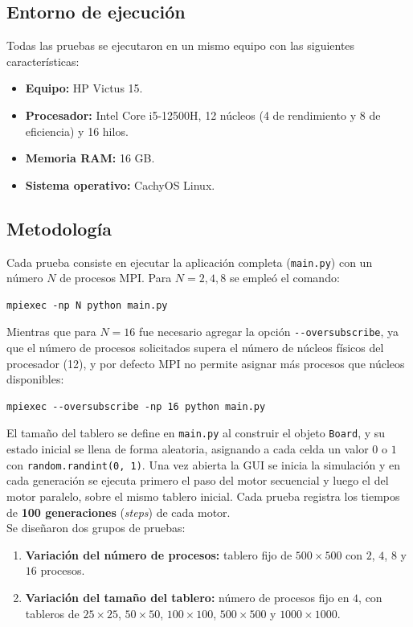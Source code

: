 \documentclass{article}
\begin{document}
\subsection{Entorno de ejecución}
Todas las pruebas se ejecutaron en un mismo equipo con las siguientes características:
\begin{itemize}
    \item \textbf{Equipo:} HP Victus 15.
    \item \textbf{Procesador:} Intel Core i5-12500H, 12 núcleos (4 de rendimiento y 8 de eficiencia) y 16 hilos.
    \item \textbf{Memoria RAM:} 16 GB.
    \item \textbf{Sistema operativo:} CachyOS Linux.
\end{itemize}

\subsection{Metodología}
Cada prueba consiste en ejecutar la aplicación completa (\verb|main.py|) con un número $N$ de procesos MPI. Para $N = 2, 4, 8$ se empleó el comando:
\begin{verbatim}
mpiexec -np N python main.py
\end{verbatim}

Mientras que para $N = 16$ fue necesario agregar la opción \verb|--oversubscribe|, ya que el número de procesos solicitados supera el número de núcleos físicos del procesador (12), y por defecto MPI no permite asignar más procesos que núcleos disponibles:
\begin{verbatim}
mpiexec --oversubscribe -np 16 python main.py
\end{verbatim}

El tamaño del tablero se define en \verb|main.py| al construir el objeto \verb|Board|, y su estado inicial se llena de forma aleatoria, asignando a cada celda un valor $0$ o $1$ con \verb|random.randint(0, 1)|. Una vez abierta la GUI se inicia la simulación y en cada generación se ejecuta primero el paso del motor secuencial y luego el del motor paralelo, sobre el mismo tablero inicial. Cada prueba registra los tiempos de \textbf{100 generaciones} (\textit{steps}) de cada motor.\\

Se diseñaron dos grupos de pruebas:
\begin{enumerate}
    \item \textbf{Variación del número de procesos:} tablero fijo de $500 \times 500$ con $2$, $4$, $8$ y $16$ procesos.
    \item \textbf{Variación del tamaño del tablero:} número de procesos fijo en $4$, con tableros de $25 \times 25$, $50 \times 50$, $100 \times 100$, $500 \times 500$ y $1000 \times 1000$.
\end{enumerate}
\end{document}
